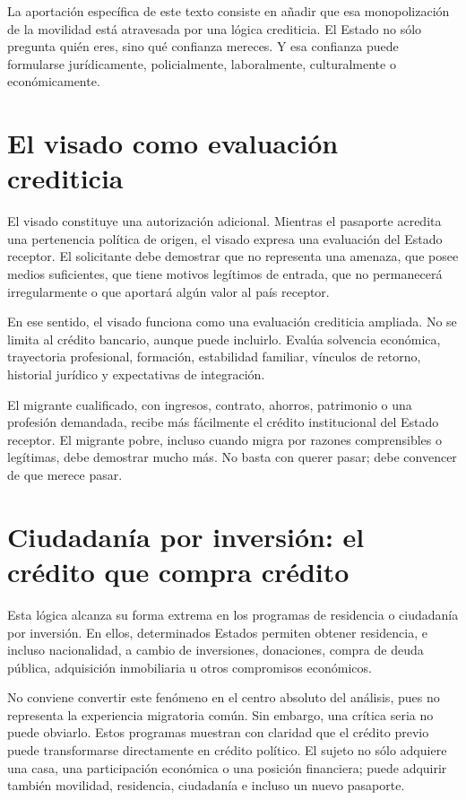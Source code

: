 \documentclass[12pt,a4paper]{article}
\begin{document}
La aportación específica de este texto consiste en añadir que esa monopolización de la movilidad está atravesada por una lógica crediticia. El Estado no sólo pregunta quién eres, sino qué confianza mereces. Y esa confianza puede formularse jurídicamente, policialmente, laboralmente, culturalmente o económicamente.

\section*{El visado como evaluación crediticia}

El visado constituye una autorización adicional. Mientras el pasaporte acredita una pertenencia política de origen, el visado expresa una evaluación del Estado receptor. El solicitante debe demostrar que no representa una amenaza, que posee medios suficientes, que tiene motivos legítimos de entrada, que no permanecerá irregularmente o que aportará algún valor al país receptor.

En ese sentido, el visado funciona como una evaluación crediticia ampliada. No se limita al crédito bancario, aunque puede incluirlo. Evalúa solvencia económica, trayectoria profesional, formación, estabilidad familiar, vínculos de retorno, historial jurídico y expectativas de integración.

El migrante cualificado, con ingresos, contrato, ahorros, patrimonio o una profesión demandada, recibe más fácilmente el crédito institucional del Estado receptor. El migrante pobre, incluso cuando migra por razones comprensibles o legítimas, debe demostrar mucho más. No basta con querer pasar; debe convencer de que merece pasar.

\section*{Ciudadanía por inversión: el crédito que compra crédito}

Esta lógica alcanza su forma extrema en los programas de residencia o ciudadanía por inversión. En ellos, determinados Estados permiten obtener residencia, e incluso nacionalidad, a cambio de inversiones, donaciones, compra de deuda pública, adquisición inmobiliaria u otros compromisos económicos.

No conviene convertir este fenómeno en el centro absoluto del análisis, pues no representa la experiencia migratoria común. Sin embargo, una crítica seria no puede obviarlo. Estos programas muestran con claridad que el crédito previo puede transformarse directamente en crédito político. El sujeto no sólo adquiere una casa, una participación económica o una posición financiera; puede adquirir también movilidad, residencia, ciudadanía e incluso un nuevo pasaporte.
\end{document}
